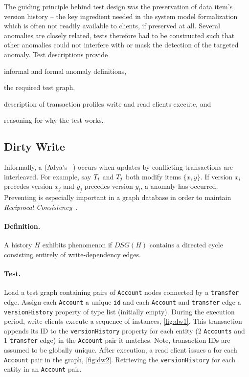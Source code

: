 The guiding principle behind test design was the preservation of data item's 
version history -- the key ingredient needed in the system model formalization 
which is often not readily available to clients, if preserved at all. Several 
anomalies are closely related, tests therefore had to be constructed such that 
other anomalies could not interfere with or mask the detection of the targeted 
anomaly. Test descriptions provide
\begin{enumerate*}[label={(\roman*)}]
  \item informal and formal anomaly definitions,
  \item the required test graph,
  \item description of transaction profiles write and read clients execute, and
  \item reasoning for why the test works.
\end{enumerate*}


\subsection{Dirty Write}
\label{sec:dirty-write}

Informally, a  (Adya's ~\cite{adya1999weak})
occurs when updates by conflicting transactions are interleaved. For example, 
say $T_i$ and $T_j$ both modify items $\{x,y\}$. If version $x_i$ 
precedes version $x_j$ and $y_j$ precedes version $y_i$, a  anomaly 
has occurred. Preventing  is especially important in a graph 
database in order to maintain \emph{Reciprocal Consistency}~\cite{Waudby2020}.

\paragraph{Definition.}
A history $H$ exhibits phenomenon  if $\textit{DSG}(H)$ contains a 
directed cycle consisting entirely of write-dependency edges.

\paragraph{Test.}
Load a test graph containing pairs of \texttt{Account} nodes connected by a 
\texttt{transfer} edge. Assign each \texttt{Account} a unique \texttt{id} and 
each \texttt{Account} and \texttt{transfer} edge a \texttt{versionHistory} 
property of type list (initially empty). During the execution period, write 
clients execute a sequence of  instances, \autoref{fig:dw1}.
This transaction appends its ID to the \texttt{versionHistory} property for each 
entity (2 \texttt{Accounts} and 1 \texttt{transfer} edge) in the \texttt{Account}
pair it matches. Note, transaction IDs are assumed to be globally unique. After 
execution, a read client issues a  for each 
\texttt{Account} pair in the graph, \autoref{fig:dw2}. Retrieving the 
\texttt{versionHistory} for each entity in an \texttt{Account} pair.

